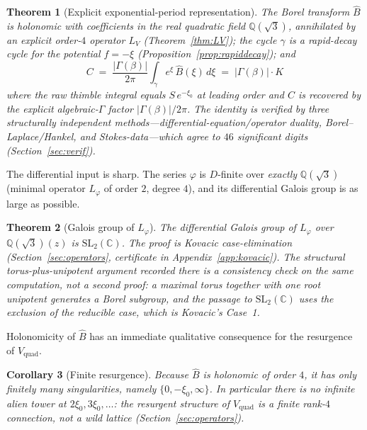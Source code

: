 \documentclass[11pt,reqno]{amsart}
\renewcommand{\_}{\vquadorigunderscore\allowbreak}
\theoremstyle{plain}
\newtheorem{theorem}{Theorem}[section]
\newtheorem{corollary}[theorem]{Corollary}
\theoremstyle{definition}
\newcommand{\Vquad}{V_{\mathrm{quad}}}
\newcommand{\Bhat}{\widehat{B}}
\newcommand{\Lphi}{L_{\varphi}}
\newcommand{\LV}{L_{V}}
\newcommand{\Qsqrt}{\mathbb{Q}(\sqrt3)}
\newcommand{\xizero}{\xi_0}
\newcommand{\SL}{\mathrm{SL}}
\providecommand{\C}{}\renewcommand{\C}{C}
\begin{document}
\begin{theorem}[Explicit exponential-period representation]\label{thm:main}
The Borel transform $\Bhat$ is holonomic with coefficients in the real quadratic field
$\Qsqrt$, annihilated by an explicit order-$4$ operator $\LV$ (Theorem~\ref{thm:LV}); the
cycle $\gamma$ is a rapid-decay cycle for the potential $f=-\xi$
(Proposition~\ref{prop:rapiddecay}); and
\begin{equation}\label{eq:main-identity}
  \boxed{\;\C\;=\;\frac{\lvert\Gamma(\beta)\rvert}{2\pi}\int_{\gamma} e^{\xi}\,\Bhat(\xi)\,d\xi
  \;=\;\lvert\Gamma(\beta)\rvert\cdot K\;}
\end{equation}
where the raw thimble integral equals $S\,e^{-\xizero}$ at leading order and $\C$ is recovered
by the explicit algebraic-$\Gamma$ factor $\lvert\Gamma(\beta)\rvert/2\pi$. The identity is
verified by three structurally independent methods---differential-equation/operator duality,
Borel--Laplace/Hankel, and Stokes-data---which agree to $46$ significant digits
(Section~\ref{sec:verif}).
\end{theorem}

The differential input is sharp. The series $\varphi$ is $D$-finite over \emph{exactly} $\Qsqrt$
(minimal operator $\Lphi$ of order $2$, degree $4$), and its differential Galois group is as
large as possible.

\begin{theorem}[Galois group of $\Lphi$]\label{thm:galois}
The differential Galois group of $\Lphi$ over $\Qsqrt(z)$ is $\SL_2(\mathbb{C})$. The proof is
Kovacic case-elimination (Section~\ref{sec:operators}, certificate in
Appendix~\ref{app:kovacic}). The structural torus-plus-unipotent argument recorded there is a
consistency check on the same computation, not a second proof: a maximal torus together with
one root unipotent generates a \emph{Borel} subgroup, and the passage to $\SL_2(\mathbb{C})$
uses the exclusion of the reducible case, which is Kovacic's Case~1.
\end{theorem}

Holonomicity of $\Bhat$ has an immediate qualitative consequence for the resurgence of $\Vquad$.

\begin{corollary}[Finite resurgence]\label{cor:finite}
Because $\Bhat$ is holonomic of order $4$, it has only finitely many singularities, namely
$\{0,-\xizero,\infty\}$. In particular there is \emph{no} infinite alien tower at
$2\xizero,3\xizero,\dots$: the resurgent structure of $\Vquad$ is a finite rank-$4$ connection,
not a wild lattice (Section~\ref{sec:operators}).
\end{corollary}
\end{document}

